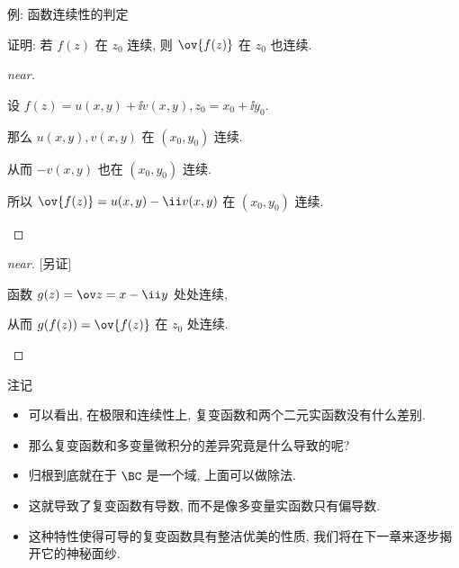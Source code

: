 \begin{frame}{例: 函数连续性的判定}
	\onslide<+->
	\begin{example}[near]
		证明: 若 $f(z)$ 在 $z_0$ 连续, 则 $\ov{f(z)}$ 在 $z_0$ 也连续.
	\end{example}
	\onslide<+->
	\begin{proof}[near]
		\begin{itemize*}
			\item 设 $f(z)=u(x,y)+\ii v(x,y),z_0=x_0+\ii y_0$.
			\item 那么 $u(x,y),v(x,y)$ 在 $(x_0,y_0)$ 连续.
			\item 从而 $-v(x,y)$ 也在 $(x_0,y_0)$ 连续.
			\item 所以 $\ov{f(z)}=u(x,y)-\ii v(x,y)$ 在 $(x_0,y_0)$ 连续.\qedhere
		\end{itemize*}
	\end{proof}
	\onslide<+->
	\begin{proof}[near][另证]
		\begin{itemize*}
			\item 函数 $g(z)=\ov z=x-\ii y$ 处处连续,
			\item 从而 $g(f(z))=\ov{f(z)}$ 在 $z_0$ 处连续.\qedhere
		\end{itemize*}
	\end{proof}
\end{frame}


\begin{frame}{注记}
	\begin{itemize}
		\item 可以看出, 在极限和连续性上, 复变函数和两个二元实函数没有什么差别.
		\item 那么复变函数和多变量微积分的差异究竟是什么导致的呢?
		\item 归根到底就在于 $\BC$ 是一个域, 上面可以做除法.
		\item 这就导致了复变函数有\alert{导数}, 而不是像多变量实函数只有偏导数.
		\item 这种特性使得可导的复变函数具有整洁优美的性质, 我们将在下一章来逐步揭开它的神秘面纱.
	\end{itemize}
\end{frame}

